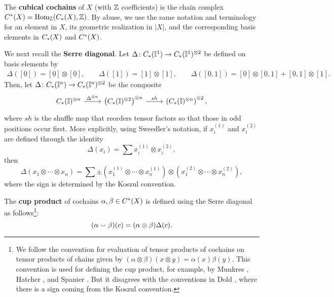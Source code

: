 The \textbf{cubical cochains} of $X$ (with $\mathbb{Z}$ coefficients) is the chain complex $C^{\ast}(X) = \textup{Hom}_{\mathbb{Z}}(C_{\ast}(X), \mathbb{Z})$.
By abuse, we use the same notation and terminology for an element in $X$, its geometric realization in $|X|$,
and the corresponding basis elements in $C_{\ast}(X)$ and $C^{\ast}(X)$.

We next recall the \textbf{Serre diagonal}.
Let $\Delta \colon C_{\ast}(\mathbb{I}^1) \to C_{\ast}(\mathbb{I}^1)^{\otimes 2}$ be defined on basis elements by
\begin{gather*}
	\Delta([\underline{0}]) = [\underline{0}] \otimes [\underline{0}], \qquad
	\Delta([\underline{1}]) = [\underline{1}] \otimes [\underline{1}], \qquad
	\Delta([\underline{0}, \underline{1}]) = [\underline{0}] \otimes [\underline{0}, \underline{1}] + [\underline{0}, \underline{1}] \otimes [\underline{1}].
\end{gather*}
Then, let
$\Delta \colon C_{\ast}(\mathbb{I}^n) \to C_{\ast}(\mathbb{I}^n)^{\otimes 2}$
be the composite
\begin{equation*}
	\begin{tikzcd}
		\chains(\interval)^{\otimes n} \arrow[r, "\Delta^{\otimes n}"] & \left( \chains(\interval)^{\otimes 2} \right)^{\otimes n} \arrow[r, "sh"] & \left( \chains(\interval)^{\otimes n} \right)^{\otimes 2},
	\end{tikzcd}
\end{equation*}
where $sh$ is the shuffle map that reorders tensor factors so that those in odd positions occur first. More explicitly, using Sweedler's notation,
if $x_i^{(1)}$ and $x_i^{(2)}$ are defined through the identity
\begin{equation*}
	\Delta(x_i) = \sum x_i^{(1)} \otimes x_i^{(2)},
\end{equation*}
then
\begin{equation}\label{E:Delta}
	\Delta (x_1 \otimes \cdots \otimes x_n) =
	\sum \pm \left( x_1^{(1)} \otimes \cdots \otimes x_n^{(1)} \right) \otimes
	\left( x_1^{(2)} \otimes \cdots \otimes x_n^{(2)} \right),
\end{equation}
where the sign is determined by the Koszul convention.

The \textbf{cup product} of cochains $\alpha, \beta \in C^{\ast}(X)$ is defined using the Serre diagonal as follows\footnote{
	We follow the convention for evaluation of tensor products of cochains on tensor products of chains given by $(\alpha\otimes \beta)(x\otimes y)=\alpha(x)\beta(y)$. This convention is used for defining the cup product, for example, by Munkres \cite[Section 60]{Munk84}, Hatcher \cite[Section 3.2]{Hat02}, and Spanier \cite[Section 5.6]{Spa81}. But it disagrees with the conventions in Dold \cite[Section VII.7]{Dol72}, where there is a sign coming from the Koszul convention.}:
\begin{equation*}
	(\alpha \smallsmile \beta)(c) = (\alpha \otimes \beta)\Delta(c).
\end{equation*}

